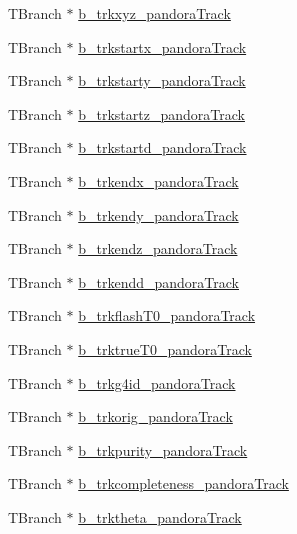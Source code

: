 \begin{DoxyCompactItemize}
\item 
T\-Branch $\ast$ \hyperlink{classanatree_a98b79dd72d2573cba9d87a9daae04561}{b\-\_\-trkxyz\-\_\-pandora\-Track}
\item 
T\-Branch $\ast$ \hyperlink{classanatree_ad3eb8dbe08bba1dc6c62ea7f0ecef222}{b\-\_\-trkstartx\-\_\-pandora\-Track}
\item 
T\-Branch $\ast$ \hyperlink{classanatree_a19283815da2847fee1d49872e9dd0a60}{b\-\_\-trkstarty\-\_\-pandora\-Track}
\item 
T\-Branch $\ast$ \hyperlink{classanatree_a1ba553abb98927982dac4b2f316971d3}{b\-\_\-trkstartz\-\_\-pandora\-Track}
\item 
T\-Branch $\ast$ \hyperlink{classanatree_a90eb713492fb0998f3508c75551dc4a6}{b\-\_\-trkstartd\-\_\-pandora\-Track}
\item 
T\-Branch $\ast$ \hyperlink{classanatree_a81358c3f976dfbcac81bf4353469f51f}{b\-\_\-trkendx\-\_\-pandora\-Track}
\item 
T\-Branch $\ast$ \hyperlink{classanatree_a153146777e062e05d088d634539342bb}{b\-\_\-trkendy\-\_\-pandora\-Track}
\item 
T\-Branch $\ast$ \hyperlink{classanatree_aba3d549c8f465fdb833a9b4887c3bc9d}{b\-\_\-trkendz\-\_\-pandora\-Track}
\item 
T\-Branch $\ast$ \hyperlink{classanatree_a1a62de7d92d5912ee306b6e4bf6938e7}{b\-\_\-trkendd\-\_\-pandora\-Track}
\item 
T\-Branch $\ast$ \hyperlink{classanatree_ae14f0aeac6cc6f497b5d59fe737dd838}{b\-\_\-trkflash\-T0\-\_\-pandora\-Track}
\item 
T\-Branch $\ast$ \hyperlink{classanatree_ae60d3999569dcc77d635c262660aedad}{b\-\_\-trktrue\-T0\-\_\-pandora\-Track}
\item 
T\-Branch $\ast$ \hyperlink{classanatree_a3f806decdafb50f40f04e32e7d280f5b}{b\-\_\-trkg4id\-\_\-pandora\-Track}
\item 
T\-Branch $\ast$ \hyperlink{classanatree_aa4e2282952d618cc0fb28f98e02a292f}{b\-\_\-trkorig\-\_\-pandora\-Track}
\item 
T\-Branch $\ast$ \hyperlink{classanatree_a5566276bcad3e1cff7e2b6d24c202055}{b\-\_\-trkpurity\-\_\-pandora\-Track}
\item 
T\-Branch $\ast$ \hyperlink{classanatree_adec982c55072c93c49201fd47c0b8025}{b\-\_\-trkcompleteness\-\_\-pandora\-Track}
\item 
T\-Branch $\ast$ \hyperlink{classanatree_a869e4f8b2b677a8346b211c6690555db}{b\-\_\-trktheta\-\_\-pandora\-Track}
\item 

\end{DoxyCompactItemize}
